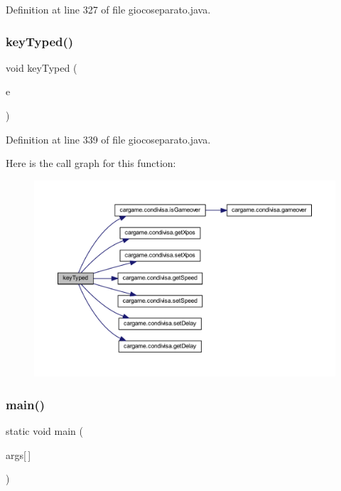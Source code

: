 Definition at line 327 of file giocoseparato.\+java.

\mbox{\label{classcargame_1_1giocoseparato_ae9358abc251c2552e1f2c743d881df8d}} 
\subsubsection{\texorpdfstring{key\+Typed()}{keyTyped()}}
{\footnotesize\ttfamily void key\+Typed (\begin{DoxyParamCaption}\item[{Key\+Event}]{e }\end{DoxyParamCaption})}



Definition at line 339 of file giocoseparato.\+java.

Here is the call graph for this function\+:
\nopagebreak
\begin{figure}[H]
\begin{center}
\leavevmode
\includegraphics[width=350pt]{classcargame_1_1giocoseparato_ae9358abc251c2552e1f2c743d881df8d_cgraph}
\end{center}
\end{figure}
\mbox{\label{classcargame_1_1giocoseparato_a75988cf84fc6ee7a2ebff36e363021aa}} 
\subsubsection{\texorpdfstring{main()}{main()}}
{\footnotesize\ttfamily static void main (\begin{DoxyParamCaption}\item[{String}]{args\mbox{[}$\,$\mbox{]} }\end{DoxyParamCaption})\hspace{0.3cm}{\ttfamily [static]}}



